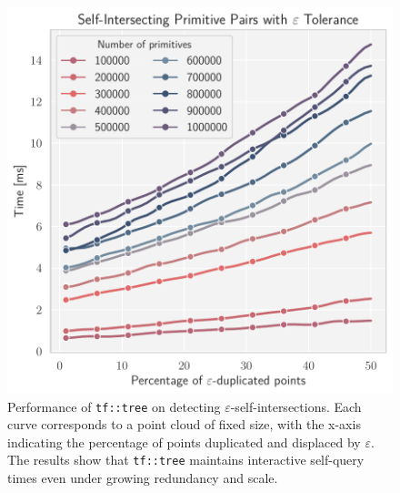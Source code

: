 \begin{figure}[!tb]
  \includegraphics[width=\linewidth]{../figures/self_search_matrix.pdf}
\caption{
Performance of \texttt{tf::tree} on detecting $\varepsilon$-self-intersections.
Each curve corresponds to a point cloud of fixed size, with the x-axis indicating
the percentage of points duplicated and displaced by $\varepsilon$. The results
show that \texttt{tf::tree} maintains interactive self-query times even under
growing redundancy and scale.
}
\label{fig:self-search}
\end{figure}
